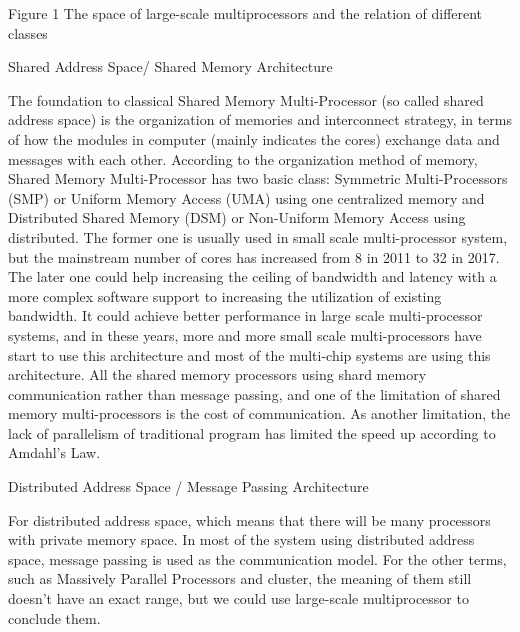 \par Figure 1 The space of large-scale multiprocessors and the relation of different classes\cite{hennessy2017computer}
\par Shared Address Space/ Shared Memory Architecture
\par The foundation to classical Shared Memory Multi-Processor (so called shared address space) is the organization of memories and interconnect strategy\cite{hennessy2017computer}, in terms of how the modules in computer (mainly indicates the cores) exchange data and messages with each other. According to the organization method of memory, Shared Memory Multi-Processor has two basic class: Symmetric Multi-Processors (SMP) or Uniform Memory Access (UMA) using one centralized memory and Distributed Shared Memory (DSM) or Non-Uniform Memory Access using distributed. The former one is usually used in small scale multi-processor system, but the mainstream number of cores has increased from 8 in 2011 to 32 in 2017\cite{hennessy2011computer}\cite{hennessy2017computer}. The later one could help increasing the ceiling of bandwidth and latency with a more complex software support to increasing the utilization of existing bandwidth. It could achieve better performance in large scale multi-processor systems, and in these years, more and more small scale multi-processors have start to use this architecture and most of the multi-chip systems are using this architecture\cite{hennessy2017computer}. All the shared memory processors using shard memory communication rather than message passing, and one of the limitation of shared memory multi-processors is the cost of communication\cite{hennessy2017computer}. As another limitation, the lack of parallelism of traditional program has limited the speed up according to Amdahl's Law.
\par Distributed Address Space / Message Passing Architecture 
\par For distributed address space, which means that there will be many processors with private memory space. In most of the system using distributed address space, message passing is used as the communication model. For the other terms, such as Massively Parallel Processors and cluster, the meaning of them still doesn't have an exact range\cite{dongarra2005high}, but we could use large-scale multiprocessor to conclude them\cite{hennessy2017computer}. 
